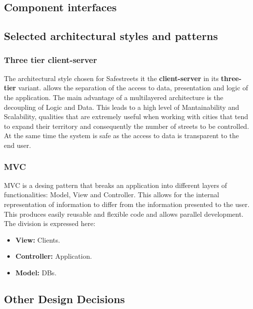 \newpage
\subsection{Component interfaces}

\subsection{Selected architectural styles and patterns}

\subsubsection{Three tier client-server}

The architectural style chosen for Safestreets it the \textbf{client-server} in its \textbf{three-tier} variant.  allows the 
separation of the access to data, presentation and logic of the application.
The main advantage of a multilayered architecture is the decoupling of Logic and Data. This leads to a high level of Mantainability and Scalability, 
qualities that are extremely useful when working with cities that tend to expand their territory and consequently the number of streets to be controlled.
At the same time the system is safe as the access to data is transparent to the end user.

\subsubsection{MVC}

MVC is a desing pattern that breaks an application into different layers	of functionalities:	Model, View and Controller.
This allows for the internal representation of information to differ from the information presented to the user. 
This produces easily reusable and flexible code and allows parallel development. The division is expressed here:

\begin{itemize}
    \item \textbf{View:} Clients.
    \item \textbf{Controller:} Application.
    \item \textbf{Model:} DBs.
    
    
\end{itemize}

\subsection{Other Design Decisions}

